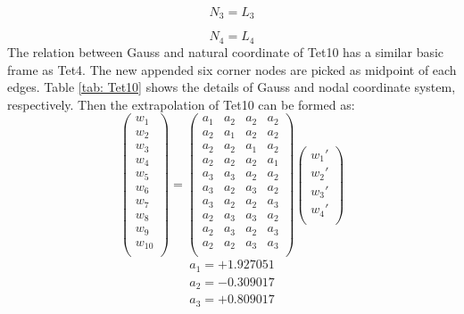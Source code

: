 \begin{equation}
N_3 = L_3
\end{equation}

\begin{equation}
N_4 = L_4
\end{equation}
\clearpage
The relation between Gauss and natural coordinate of Tet10 has a similar basic frame as Tet4. The new appended six corner nodes are picked as midpoint of each edges. Table \ref{tab: Tet10} shows the details of Gauss and nodal coordinate system, respectively. Then the extrapolation of Tet10 can be formed as:
\begin{equation}
\begin{pmatrix}
w_1 \\
w_2 \\
w_3 \\
w_4 \\
w_5 \\
w_6 \\
w_7 \\
w_8 \\
w_9 \\
w_{10} \\
\end{pmatrix} = \begin{pmatrix}
a_1 & a_2 &  a_2 &  a_2      \\[0.3em]
a_2 & a_1 &  a_2 &  a_2      \\[0.3em]
a_2 & a_2 &  a_1 &  a_2      \\[0.3em]
a_2 & a_2 &  a_2 &  a_1      \\[0.3em]
a_3 & a_3 &  a_2 &  a_2      \\[0.3em]
a_3 & a_2 &  a_3 &  a_2      \\[0.3em]
a_3 & a_2 &  a_2 &  a_3      \\[0.3em]
a_2 & a_3 &  a_3 &  a_2      \\[0.3em]
a_2 & a_3 &  a_2 &  a_3      \\[0.3em]
a_2 & a_2 &  a_3 &  a_3      \\[0.3em]
\end{pmatrix} \begin{pmatrix}
{w_1}' \\
{w_2}' \\
{w_3}' \\
{w_4}' \\
\end{pmatrix}
\end{equation}	
\begin{align*}
a_1 = +1.927051 \\
a_2 = -0.309017 \\
a_3 = +0.809017
\end{align*}
